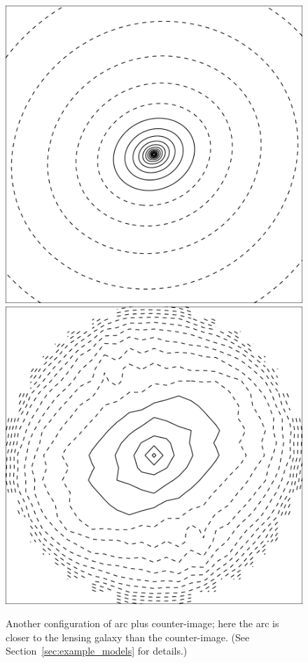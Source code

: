 \documentclass[usenatbib]{mn2e}
\newcommand{\secref}[1]{Section~\ref{sec:#1}}
\newlength{\myplotswidth}
\begin{document}
\begin{figure}
  \includegraphics[width=\myplotswidth]{fig/ASW0002z6f_006919_kappa}
  \includegraphics[width=\myplotswidth]{fig/006919_mass}

  \caption[result 6919 (ASW0002z6f)]{Another configuration of arc plus
    counter-image; here the arc is closer to the lensing galaxy than
    the counter-image. (See \secref{example_models} for details.)}
  \label{fig:6919}
\end{figure}
\end{document}
